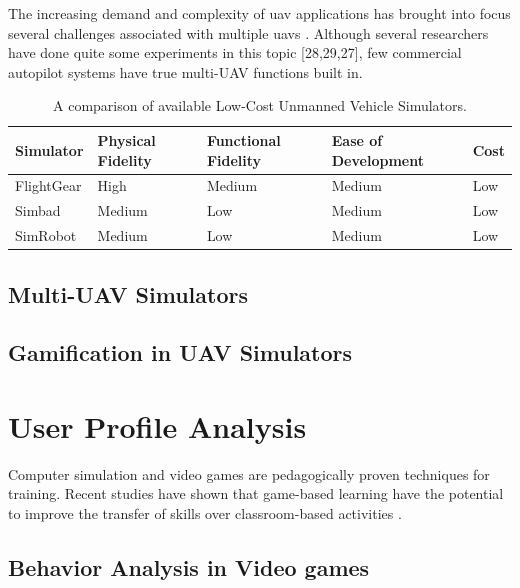 The increasing demand and complexity of \gls{uav} applications has brought into focus several challenges associated with multiple \glspl{uav} \cite{bertuccelli2009real}. Although several researchers have done quite some experiments in this topic [28,29,27], few commercial autopilot systems have true multi-UAV functions built in.




\begin{table}[hbt]	
\caption{A comparison of available Low-Cost Unmanned Vehicle Simulators.}
\label{table:lowCostUVSimulators}
\centering
\begin{tabularx}{\textwidth}{|X|X|X|X|X|}
\hline
\textbf{Simulator} & \textbf{Physical Fidelity} & \textbf{Functional Fidelity} & \textbf{Ease of Development} & \textbf{Cost}

\\ \hline
FlightGear & High & Medium & Medium & Low
\\ \hline
Simbad & Medium & Low & Medium & Low
\\ \hline
SimRobot & Medium & Low & Medium & Low 
\\ \hline
\end{tabularx}
\end{table}


\subsection{Multi-UAV Simulators}

\subsection{Gamification in UAV Simulators}

\section{User Profile Analysis}
Computer simulation and video games are pedagogically proven techniques for training. Recent studies have shown that game-based learning have the potential to improve the transfer of skills over classroom-based activities \cite{alexander2005gaming,aitkin2004playing,green2003action}.

\subsection{Behavior Analysis in Video games}
\NewPage